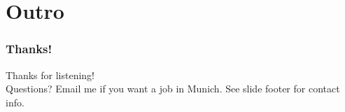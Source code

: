 \documentclass[t]{beamer}
\begin{document}

\section{Outro}

\begin{frame}
	\frametitle{Thanks!}
	\begin{center}
		\vfill
		Thanks for listening!\\
		\vfill
		Questions?
		\vfill
		Email me if you want a job in Munich.
		\vfill
		See slide footer for contact info.
		\vfill
	\end{center}
\end{frame}
\end{document}
